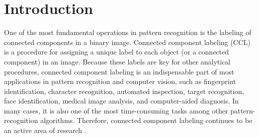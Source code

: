 \vspace{\sectionSpace}
\section{Introduction}

One of the most fundamental operations in pattern recognition is the labeling of connected components in a binary image.
Connected component labeling (CCL) is a procedure for assigning a unique label
to each object (or a connected component) in an image. Because these labels are key for other analytical procedures, connected component labeling is an 
indispensable part of most applications in pattern recognition and computer vision, such as fingerprint identification,
character recognition, automated inspection, target recognition, face identification, medical image analysis, and 
computer-aided diagnosis. In many cases, it is also one of the most time-consuming tasks among other 
pattern-recognition algorithms\cite{Alnuweiri1992_Parallel}. Therefore, connected component labeling continues 
to be an active area of research \cite{Gonzales_Digital,Agarwal2006_Efficient,Chang2004_Linear,Hayashi2001_Fast,
Hu2005_Fast,Knop1998_Parallel,Moga1997_Parallel,Wang2003_Parallel}.


